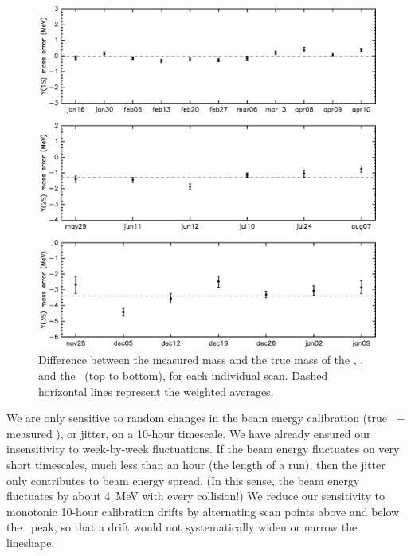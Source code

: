 \documentclass{cornell}
\begin{document}
\begin{figure}[p]
  \begin{center}
    \includegraphics[width=\linewidth]{beamenergydrift}
  \end{center}
  \caption[Beam energy calibration as a function of
  date]{\label{beamenergydrift} Difference between the measured mass
  and the true mass of the \us, \uss, and the \usss\ (top to bottom),
  for each individual scan.  Dashed horizontal lines represent the
  weighted averages.}
\end{figure}

We are only sensitive to random changes in the beam energy calibration
(true \ebeam\ $-$ measured \ebeam), or jitter, on a 10-hour timescale.
We have already ensured our insensitivity to week-by-week
fluctuations.  If the beam energy fluctuates on very short timescales,
much less than an hour (the length of a run), then the jitter only
contributes to beam energy spread.  (In this sense, the beam energy
fluctuates by about 4~MeV with every collision!)  We reduce our
sensitivity to monotonic 10-hour calibration drifts by alternating
scan points above and below the \ups\ peak, so that a drift would not
systematically widen or narrow the lineshape.
\end{document}
